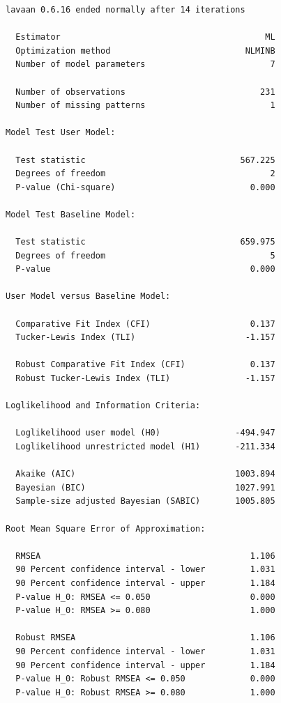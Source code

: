 \documentclass[
  11pt,
]{book}
\begin{document}
\begin{verbatim}
lavaan 0.6.16 ended normally after 14 iterations

  Estimator                                         ML
  Optimization method                           NLMINB
  Number of model parameters                         7

  Number of observations                           231
  Number of missing patterns                         1

Model Test User Model:
                                                      
  Test statistic                               567.225
  Degrees of freedom                                 2
  P-value (Chi-square)                           0.000

Model Test Baseline Model:

  Test statistic                               659.975
  Degrees of freedom                                 5
  P-value                                        0.000

User Model versus Baseline Model:

  Comparative Fit Index (CFI)                    0.137
  Tucker-Lewis Index (TLI)                      -1.157
                                                      
  Robust Comparative Fit Index (CFI)             0.137
  Robust Tucker-Lewis Index (TLI)               -1.157

Loglikelihood and Information Criteria:

  Loglikelihood user model (H0)               -494.947
  Loglikelihood unrestricted model (H1)       -211.334
                                                      
  Akaike (AIC)                                1003.894
  Bayesian (BIC)                              1027.991
  Sample-size adjusted Bayesian (SABIC)       1005.805

Root Mean Square Error of Approximation:

  RMSEA                                          1.106
  90 Percent confidence interval - lower         1.031
  90 Percent confidence interval - upper         1.184
  P-value H_0: RMSEA <= 0.050                    0.000
  P-value H_0: RMSEA >= 0.080                    1.000
                                                      
  Robust RMSEA                                   1.106
  90 Percent confidence interval - lower         1.031
  90 Percent confidence interval - upper         1.184
  P-value H_0: Robust RMSEA <= 0.050             0.000
  P-value H_0: Robust RMSEA >= 0.080             1.000


\end{verbatim}
\end{document}
